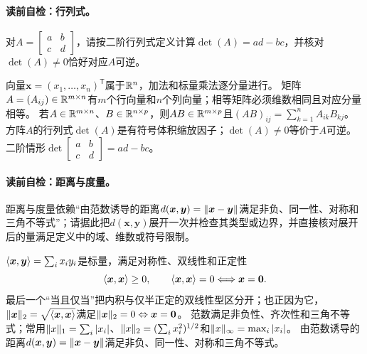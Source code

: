 \paragraph{读前自检：行列式。}对$A=\begin{bmatrix}a&b\\c&d\end{bmatrix}$，请按二阶行列式定义计算$\det(A)=ad-bc$，并核对$\det(A)\ne0$恰好对应$A$可逆。\par

向量$\boldsymbol{x}=(x_1,\ldots,x_n)^{\mathsf T}$属于$\mathbb{R}^n$，加法和标量乘法逐分量进行。
矩阵$A=(A_{ij})\in\mathbb{R}^{m\times n}$有$m$个行向量和$n$个列向量；相等矩阵必须维数相同且对应分量相等。
若$A\in\mathbb{R}^{m\times n}$、$B\in\mathbb{R}^{n\times p}$，则$AB\in\mathbb{R}^{m\times p}$且$(AB)_{ij}=\sum_{k=1}^{n}A_{ik}B_{kj}$。
方阵$A$的行列式$\det(A)$是有符号体积缩放因子；$\det(A)\ne0$等价于$A$可逆。二阶情形$\det\begin{bmatrix}a&b\\c&d\end{bmatrix}=ad-bc$。


\paragraph{读前自检：距离与度量。}距离与度量依赖“由范数诱导的距离$d(\boldsymbol{x},\boldsymbol{y})=\lVert\boldsymbol{x}-\boldsymbol{y}\rVert$满足非负、同一性、对称和三角不等式”；请据此把$d(\boldsymbol{x},\boldsymbol{y})$展开一次并检查其类型或边界，并直接核对展开后的量满足定义中的域、维数或符号限制。\par

$\langle\boldsymbol{x},\boldsymbol{y}\rangle=\sum_i x_i y_i$是标量，满足对称性、双线性和正定性
\[
\langle\boldsymbol{x},\boldsymbol{x}\rangle\ge0,
\qquad
\langle\boldsymbol{x},\boldsymbol{x}\rangle=0
\Longleftrightarrow \boldsymbol{x}=\boldsymbol0.
\]
最后一个“当且仅当”把内积与仅半正定的双线性型区分开；也正因为它，$\lVert\boldsymbol{x}\rVert_2=\sqrt{\langle\boldsymbol{x},\boldsymbol{x}\rangle}$满足$\lVert\boldsymbol{x}\rVert_2=0\Leftrightarrow\boldsymbol{x}=\boldsymbol0$。
范数满足非负性、齐次性和三角不等式；常用$\lVert x\rVert_1=\sum_i|x_i|$、$\lVert x\rVert_2=(\sum_i x_i^2)^{1/2}$和$\lVert x\rVert_{\infty}=\max_i|x_i|$。
由范数诱导的距离$d(\boldsymbol{x},\boldsymbol{y})=\lVert\boldsymbol{x}-\boldsymbol{y}\rVert$满足非负、同一性、对称和三角不等式。
